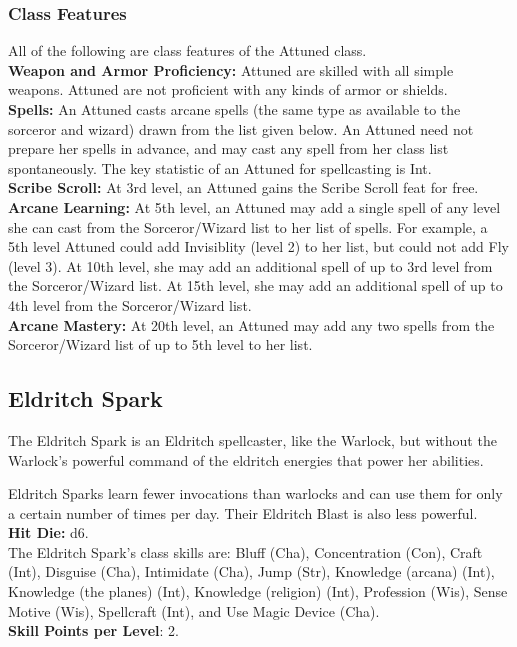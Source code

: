 \documentclass[11pt]{report}
\begin{document}
\subsubsection{Class Features}
All of the following are class features of the Attuned class. \\
\textbf{Weapon and Armor Proficiency:} Attuned are skilled with all simple
weapons. Attuned are not proficient with any kinds of armor or shields. \\
\textbf{Spells:} An Attuned casts arcane spells (the same type as available to
the sorceror and wizard) drawn from the list given below. An Attuned need not
prepare her spells in advance, and may cast any spell from her class list
spontaneously. The key statistic of an Attuned for spellcasting is Int. \\
\textbf{Scribe Scroll:} At 3rd level, an Attuned gains the Scribe Scroll feat
for free. \\
\textbf{Arcane Learning:} At 5th level, an Attuned may add a single spell of any
level she can cast from the Sorceror/Wizard list to her list of spells. For
example, a 5th level Attuned could add Invisiblity (level 2) to her list, but could not
add Fly (level 3). At 10th level, she may add an additional spell of up to 3rd
level from the Sorceror/Wizard list. At 15th level, she may add an additional
spell of up to 4th level from the Sorceror/Wizard list. \\
\textbf{Arcane Mastery:} At 20th level, an Attuned may add any two spells from
the Sorceror/Wizard list of up to 5th level to her list.

\subsection{Eldritch Spark}
The Eldritch Spark is an Eldritch spellcaster, like the Warlock, but without the
Warlock's powerful command of the eldritch energies that power her abilities.

Eldritch Sparks learn fewer invocations than warlocks and can use them for only
a certain number of times per day. Their Eldritch Blast is also less powerful.
\\
\textbf{Hit Die:} d6. \\
The Eldritch Spark's class skills are: Bluff (Cha), Concentration (Con), Craft
(Int), Disguise (Cha), Intimidate (Cha), Jump (Str), Knowledge (arcana) (Int),
Knowledge (the planes) (Int), Knowledge (religion) (Int), Profession (Wis),
Sense Motive (Wis), Spellcraft (Int), and Use Magic Device (Cha). \\
\textbf{Skill Points per Level}: 2.
\end{document}
